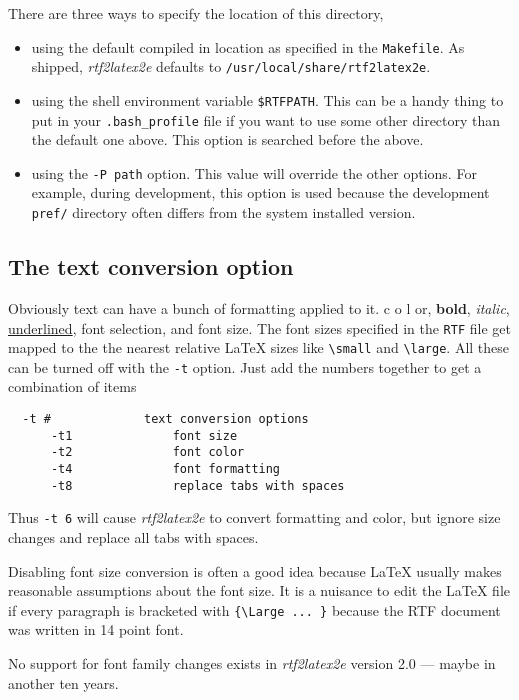 \documentclass{article}
\def\rtf2latex2e{{\it rtf2latex2e}}
\begin{document}
There are three ways to specify the location of this directory, 
\begin{itemize}
\item
using the default compiled in location as specified in the \texttt{Makefile}.  As
shipped, \rtf2latex2e{} defaults to \texttt{/usr/local/share/rtf2latex2e}.
\item
using the shell environment variable \texttt{\$RTFPATH}.  This can be a handy thing
to put in your \texttt{.bash\_profile} file if you want to use some other directory
than the default one above.  This option is searched before the above.
\item
using the \texttt{-P path} option.  This value will override the other options.  For example, during
development, this option is used because the development \texttt{pref/}
directory often differs from the system installed version.
\end{itemize}

\subsection{The text conversion option}

Obviously text can have a bunch of formatting applied to it.
{\color{color6} c}{\color{color2} o}{\color{color4} l}{\color{color10}
o}r, {\bf bold}, {\em italic}, {\underline {underlined}}, font selection,
and font size. The font sizes specified in the \texttt{RTF} file get mapped to the 
the nearest relative \LaTeX{} sizes like \verb#\small# and \verb#\large#.
All these can be turned off with the \texttt{-t} option.  Just add the
numbers together to get a combination of items
\begin{verbatim}
  -t #             text conversion options
      -t1              font size
      -t2              font color
      -t4              font formatting
      -t8              replace tabs with spaces
\end{verbatim}
Thus \texttt{-t 6}          
will cause \rtf2latex2e{} to convert formatting and color, but
ignore size changes and replace all tabs with spaces.

Disabling font size conversion is often a good idea because
\LaTeX{} usually makes reasonable assumptions about the font size.
It is a nuisance to edit the \LaTeX{} file if every paragraph is bracketed with 
\verb#{\Large ... }# because the RTF document was written in 
14 point font.

No support for font family changes exists in \rtf2latex2e{} version 2.0
--- maybe in another ten years.
\end{document}
